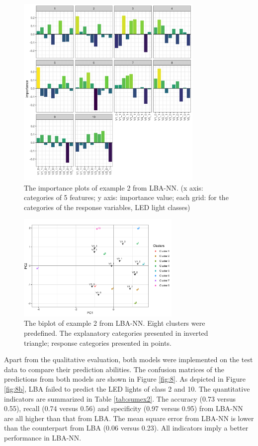 \documentclass[]{interact}
\theoremstyle{plain}%
\theoremstyle{definition}
\theoremstyle{remark}
\begin{document}
\begin{figure}[H]
\centering
\includegraphics[width=0.8\textwidth]{figure/6_importance_plot_example_2.png}
\caption{The importance plots of example 2 from LBA-NN. (x axis: categories of 5 features; y axis: importance value; each grid: for the categories of the response variables, LED light classes) \label{fig:impex2}}
\end{figure}

\begin{figure}[H]
\centering
\includegraphics[width=0.7\textwidth]{figure/7_biplot_example_2.png}
\caption{The biplot of example 2 from LBA-NN. Eight clusters were predefined. The explanatory categories presented in inverted triangle; response categories presented in points.
\label{fig:bipex2}}
\end{figure}

Apart from the qualitative evaluation, both models were implemented on
the test data to compare their prediction abilities. The confusion
matrices of the predictions from both models are shown in Figure
\ref{fig:8}. As depicted in Figure \ref{fig:8b}, LBA failed to predict
the LED lights of class 2 and 10. The quantitative indicators are
summarized in Table \ref{tab:sumex2}. The accuracy (0.73 versus 0.55),
recall (0.74 versus 0.56) and specificity (0.97 versus 0.95) from LBA-NN
are all higher than that from LBA. The mean square error from LBA-NN is
lower than the counterpart from LBA (0.06 versus 0.23). All indicators
imply a better performance in LBA-NN.
\end{document}
